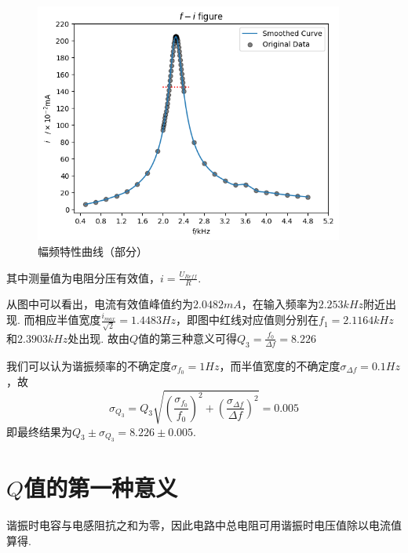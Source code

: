 \documentclass[12pt, a4paper]{ctexart}
\begin{document}
\begin{figure}
    \centering
    \includegraphics[width = 4in]{figure/f-i figure.png}
    \caption{幅频特性曲线（部分）}
    \label{fig2}
\end{figure}
其中测量值为电阻分压有效值，$i = \frac{U_{Reff}}{R}$.

从图中可以看出，电流有效值峰值约为$2.0482mA$，在输入频率为$2.253kHz$附近出现.
而相应半值宽度$\frac{i_{max}}{\sqrt{2}} = 1.4483Hz$，即图中红线对应值则分别在$f_1 = 2.1164kHz$和$2.3903kHz$处出现.
故由$Q$值的第三种意义可得$Q_3 = \frac{f_0}{\Delta f} = 8.226$

我们可以认为谐振频率的不确定度$\sigma_{f_0} = 1Hz$，而半值宽度的不确定度$\sigma_{\Delta f} = 0.1Hz$，故
\begin{equation*}
  \sigma_{Q_3} = Q_3\sqrt{(\frac{\sigma_{f_0}}{f_0})^2 + (\frac{\sigma_{\Delta f}}{\Delta f})^2} = 0.005
\end{equation*}
即最终结果为$Q_3 \pm \sigma_{Q_3} = 8.226 \pm 0.005$\footnotemark.

\section{$Q$值的第一种意义}
谐振时电容与电感阻抗之和为零，因此电路中总电阻可用谐振时电压值除以电流值算得.
\end{document}
